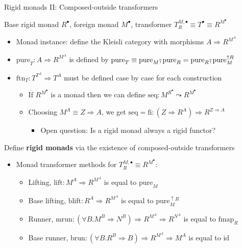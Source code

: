 \documentclass[english]{beamer}
\newcommand{\bef}{\ensuremath\raisebox{2pt}{$\mathsmaller{\mathsmaller{\circ}}$}\hspace{-3.3pt},}
\begin{document}
\begin{frame}{Rigid monads II: Composed-outside transformers}

Base rigid monad $R^{\bullet}$, foreign monad $M^{\bullet}$, transformer
{\footnotesize{}$T_{R}^{M,\bullet}\equiv T^{\bullet}\equiv R^{M^{\bullet}}$}{\footnotesize\par}
\begin{itemize}
\item Monad instance: define the Kleisli category with morphisms $A\Rightarrow R^{M^{A}}$
\item $\text{pure}_{T}:A\Rightarrow R^{M^{A}}$ is defined by {\footnotesize{}$\text{pure}_{T}\equiv\text{pure}_{M}\bef\text{pure}_{R}=\text{pure}_{R}\bef\text{pure}_{M}^{\uparrow R}$}{\footnotesize\par}
\item $\text{ftn}_{T}:T^{T^{A}}\Rightarrow T^{A}$ must be defined case
by case for each construction
\begin{itemize}
\item If $R^{M^{\bullet}}$ is a monad then we can define $\text{seq}:M^{R^{\bullet}}\leadsto R^{M^{\bullet}}$
\item Choosing $M^{A}\equiv Z\Rightarrow A$, we get $\text{seq}=\text{fi}:\left(Z\Rightarrow R^{A}\right)\Rightarrow R^{Z\Rightarrow A}$
\begin{itemize}
\item Open question: Is a rigid monad always a rigid functor?
\end{itemize}
\end{itemize}
\end{itemize}
Define \textbf{rigid monads} via the existence of composed-outside
transformers
\begin{itemize}
\item Monad transformer methods for $T_{R}^{M,\bullet}\equiv R^{M^{\bullet}}$:
\begin{itemize}
\item Lifting, $\text{lift}:M^{A}\Rightarrow R^{M^{A}}$ is equal to $\text{pure}_{M}$
\item Base lifting, $\text{blift}:R^{A}\Rightarrow R^{M^{A}}$ is equal
to $\text{pure}_{M}^{\uparrow R}$
\item Runner, $\text{mrun}:\left(\forall B.M^{B}\Rightarrow N^{B}\right)\Rightarrow R^{M^{A}}\Rightarrow R^{N^{A}}$
is equal to $\text{fmap}_{R}$
\item Base runner, $\text{brun}:\left(\forall B.R^{B}\Rightarrow B\right)\Rightarrow R^{M^{A}}\Rightarrow M^{A}$
is equal to $\text{id}$

\end{itemize}
\end{itemize}
\end{frame}
\end{document}
